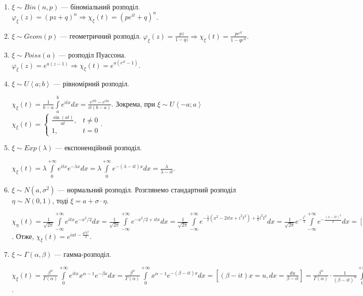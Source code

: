 \begin{enumerate}
    \item $\xi \sim {Bin}(n,p)$ --- біноміальний розподіл.
    $\varphi_\xi(z) = (pz+q)^n \Rightarrow \chi_\xi(t) = \left( p e^{it} + q\right)^n$.
    \item $\xi \sim {Geom}(p)$ --- геометричний розподіл.
    $\varphi_\xi(z) = \frac{pz}{1-qz} \Rightarrow \chi_\xi(t) = \frac{p e^{it}}{1-q e^{it}}$.
    \item $\xi \sim {Poiss}(a)$ --- розподіл Пуассона.
    $\varphi_\xi(z) = e^{a(z-1)} \Rightarrow \chi_\xi(t) = e^{a(e^{it}-1)}$.
    \item $\xi \sim {U}\left< a; b\right>$ --- рівномірний розподіл.

    $\chi_\xi(t) = \frac{1}{b-a} \int\limits_a^b e^{itx} dx = \frac{e^{itb} - e^{ita}}{it(b-a)}$.
    Зокрема, при $\xi \sim {U}\left< -a; a\right>$ $\chi_\xi(t) = \begin{cases}
        \frac{\sin(at)}{at}, & t \neq 0 \\
        1, & t = 0
    \end{cases}$.
    \item $\xi \sim {Exp}(\lambda)$ --- експоненційний розподіл.
    
    $\chi_\xi(t) = \lambda \int\limits_0^{+\infty} e^{itx} e^{-\lambda x} dx = \lambda \int\limits_0^{+\infty} e^{-(\lambda-it)x} dx = \frac{\lambda}{\lambda - it}$.
    \item $\xi \sim {N}(a, \sigma^2)$ --- нормальний розподіл. Розглянемо стандартний розподіл $\eta \sim {N}(0, 1)$,
    тоді $\xi = a + \sigma\cdot\eta$.

    $\chi_\eta(t) = \frac{1}{\sqrt{2\pi}} \int\limits_{-\infty}^{+\infty} e^{itx} e^{-x^2/2} dx = 
    \frac{1}{\sqrt{2\pi}} \int\limits_{-\infty}^{+\infty} e^{-x^2/2 + itx} dx = 
    \frac{1}{\sqrt{2\pi}} \int\limits_{-\infty}^{+\infty} e^{-\frac{1}{2}(x^2 - 2itx + i^2t^2) + \frac{1}{2}i^2t^2} dx = 
    \frac{1}{\sqrt{2\pi}} e^{-\frac{t^2}{2}} \int\limits_{-\infty}^{+\infty} e^{-\frac{(x-it)^2}{2}} dx = 
    \left[ x+it = u, dx = du\right] = e^{-\frac{t^2}{2}}$.
    Отже, $\chi_\xi(t) = e^{iat - \frac{\sigma^2 t^2}{2}}$.
    \item $\xi \sim \Gamma(\alpha, \beta)$ --- гамма-розподіл.
    
    $\chi_\xi(t) = \frac{\beta^\alpha}{\Gamma(\alpha)} \int\limits_0^{+\infty} e^{itx} x^{\alpha-1} e^{-\beta x} dx =
    \frac{\beta^\alpha}{\Gamma(\alpha)} \int\limits_0^{+\infty} x^{\alpha-1} e^{-(\beta-it) x} dx = \left[ (\beta-it) x = u, dx = \frac{du}{\beta-it}\right] = 
    \frac{\beta^\alpha}{\Gamma(\alpha)} \cdot \frac{1}{(\beta-it)^\alpha} \int\limits_0^{+\infty} u^{\alpha-1} e^{-u} du = 
    \frac{\beta^\alpha}{\Gamma(\alpha)} \cdot \frac{1}{(\beta-it)^\alpha} \cdot \Gamma(\alpha) = (1-\frac{it}{\beta})^{-\alpha}$.
\end{enumerate}

